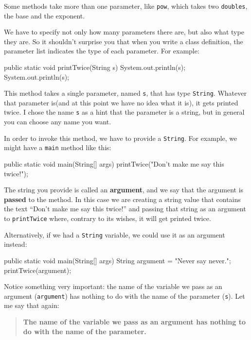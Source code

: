 \documentclass{book}
\begin{document}
Some methods take more than one parameter, like {\tt pow},
which takes two {\tt doubles}, the base and the exponent.

We have to specify not
only how many parameters there are, but also what type they
are.  So it shouldn't surprise you that when you write a
class definition, the parameter list indicates the type of
each parameter.  For example:

\begin{verbatimtab}
  public static void printTwice(String s) {
    System.out.println(s);
    System.out.println(s);
  }
\end{verbatimtab}
%
This method takes a single parameter, named {\tt s}, that
has type {\tt String}.  Whatever that parameter is(and at
this point we have no idea what it is), it gets printed
twice.  I chose the name {\tt s} as a hint that the parameter
is a string, but in general you can choose any name you want.

In order to invoke this method, we have to provide a {\tt String}.
For example, we might have a {\tt main} method like this:

\begin{verbatimtab}
  public static void main(String[] args) {
    printTwice("Don't make me say this twice!");
  }
\end{verbatimtab}

The string you provide is called an {\bf argument}, and we
say that the argument is {\bf passed} to the method.  In
this case we are creating a string value that contains the
text ``Don't make me say this twice!'' and passing that
string as an argument to {\tt printTwice} where, contrary
to its wishes, it will get printed twice.

Alternatively, if we had a {\tt String} variable, we could
use it as an argument instead:

\begin{verbatimtab}
  public static void main(String[] args) {
    String argument = "Never say never.";
    printTwice(argument);
  }
\end{verbatimtab}
%
Notice something very important: the name of the variable we pass
as an argument ({\tt argument}) has nothing to do with the name of the
parameter ({\tt s}).  Let me say that again:

\begin{quote}

{\bf The name of the variable we pass as an argument has nothing to do
with the name of the parameter.}

\end{quote}
\end{document}

